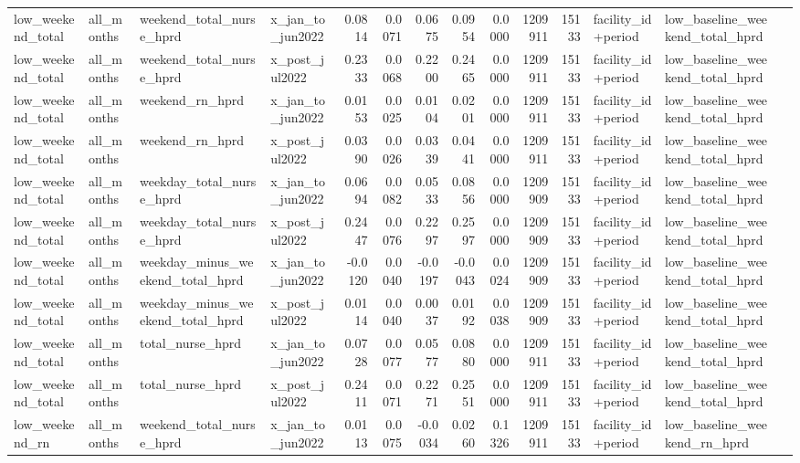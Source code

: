\begin{tabular}{llllrrrrrrrlll}
low_weekend_total & all_months & weekend_total_nurse_hprd & x_jan_to_jun2022 & 0.0814 & 0.0071 & 0.0675 & 0.0954 & 0.0000 & 1209911 & 15133 & facility_id+period & low_baseline_weekend_total_hprd &  \\
low_weekend_total & all_months & weekend_total_nurse_hprd & x_post_jul2022 & 0.2333 & 0.0068 & 0.2200 & 0.2465 & 0.0000 & 1209911 & 15133 & facility_id+period & low_baseline_weekend_total_hprd &  \\
low_weekend_total & all_months & weekend_rn_hprd & x_jan_to_jun2022 & 0.0153 & 0.0025 & 0.0104 & 0.0201 & 0.0000 & 1209911 & 15133 & facility_id+period & low_baseline_weekend_total_hprd &  \\
low_weekend_total & all_months & weekend_rn_hprd & x_post_jul2022 & 0.0390 & 0.0026 & 0.0339 & 0.0441 & 0.0000 & 1209911 & 15133 & facility_id+period & low_baseline_weekend_total_hprd &  \\
low_weekend_total & all_months & weekday_total_nurse_hprd & x_jan_to_jun2022 & 0.0694 & 0.0082 & 0.0533 & 0.0856 & 0.0000 & 1209909 & 15133 & facility_id+period & low_baseline_weekend_total_hprd &  \\
low_weekend_total & all_months & weekday_total_nurse_hprd & x_post_jul2022 & 0.2447 & 0.0076 & 0.2297 & 0.2597 & 0.0000 & 1209909 & 15133 & facility_id+period & low_baseline_weekend_total_hprd &  \\
low_weekend_total & all_months & weekday_minus_weekend_total_hprd & x_jan_to_jun2022 & -0.0120 & 0.0040 & -0.0197 & -0.0043 & 0.0024 & 1209909 & 15133 & facility_id+period & low_baseline_weekend_total_hprd &  \\
low_weekend_total & all_months & weekday_minus_weekend_total_hprd & x_post_jul2022 & 0.0114 & 0.0040 & 0.0037 & 0.0192 & 0.0038 & 1209909 & 15133 & facility_id+period & low_baseline_weekend_total_hprd &  \\
low_weekend_total & all_months & total_nurse_hprd & x_jan_to_jun2022 & 0.0728 & 0.0077 & 0.0577 & 0.0880 & 0.0000 & 1209911 & 15133 & facility_id+period & low_baseline_weekend_total_hprd &  \\
low_weekend_total & all_months & total_nurse_hprd & x_post_jul2022 & 0.2411 & 0.0071 & 0.2271 & 0.2551 & 0.0000 & 1209911 & 15133 & facility_id+period & low_baseline_weekend_total_hprd &  \\
low_weekend_rn & all_months & weekend_total_nurse_hprd & x_jan_to_jun2022 & 0.0113 & 0.0075 & -0.0034 & 0.0260 & 0.1326 & 1209911 & 15133 & facility_id+period & low_baseline_weekend_rn_hprd &  \\

\end{tabular}
